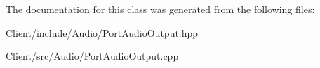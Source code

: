 The documentation for this class was generated from the following files\+:\begin{DoxyCompactItemize}
\item 
Client/include/\+Audio/Port\+Audio\+Output.\+hpp\item 
Client/src/\+Audio/Port\+Audio\+Output.\+cpp\end{DoxyCompactItemize}
